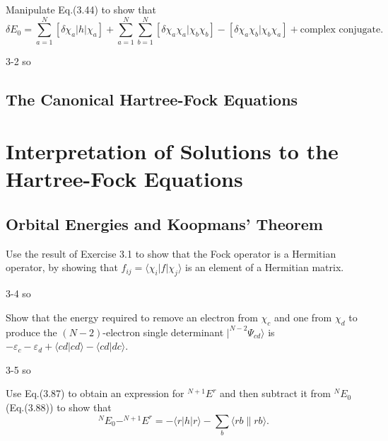 \documentclass[a4paper]{book}
\newcommand\lr[2]{\langle#1\|#2\rangle}
\begin{document}
	\begin{exercise}
	Manipulate Eq.(3.44) to show that
	\[
		\delta E_0 = \sum_{a=1}^N [\delta \chi_a | h | \chi_a ] + \sum_{a=1}^N \sum_{b=1}^N [\delta \chi_a \chi_a | \chi_b \chi_b] - [\delta \chi_a \chi_b | \chi_b \chi_a] + \text{complex conjugate}.
	\]
	\end{exercise}
	
	\begin{solution}
		3-2 so
	\end{solution}
	
	\subsection{The Canonical Hartree-Fock Equations}
	
	\section{Interpretation of Solutions to the Hartree-Fock Equations}
	
	\subsection{Orbital Energies and Koopmans' Theorem}
	
	\begin{exercise}
	Use the result of Exercise 3.1 to show that the Fock operator is a Hermitian operator, by showing that $f_{ij}=\langle \chi_i | f | \chi_j \rangle$ is an element of a Hermitian matrix.
	\end{exercise}
	
	\begin{solution}
		3-4 so
	\end{solution}
	
	\begin{exercise}
	Show that the energy required to remove an electron from $\chi_c$ and one from $\chi_d$ to produce the $(N-2)$-electron single determinant $|^{N-2}\Psi_{cd}\rangle$ is $-\varepsilon_c - \varepsilon_d + \langle cd | cd \rangle - \langle cd | dc \rangle$.
	\end{exercise}
	
	\begin{solution}
		3-5 so
	\end{solution}
	
	\begin{exercise}
	Use Eq.(3.87) to obtain an expression for $^{N+1}E^r$ and then subtract it from $^NE_0$ (Eq.(3.88)) to show that
	\[
		^N E_0 - ^{N+1} E^r = - \langle r | h | r \rangle - \sum_b \lr{rb}{rb}.
	\]
	\end{exercise}
	
\end{document}
